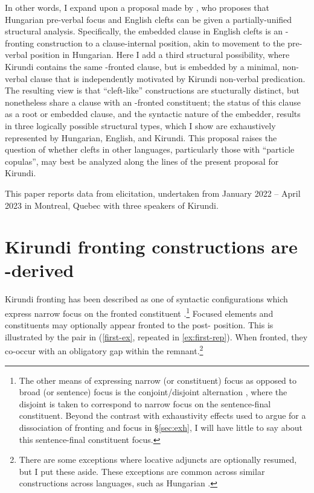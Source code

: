 \documentclass[12pt]{article}
\begin{document}
In other words, I expand upon a proposal made by \citet{ekiss-1998}, who proposes that Hungarian pre-verbal focus and English clefts can be given a partially-unified structural analysis. Specifically, the embedded clause in English clefts is an \abar{}-fronting construction to a clause-internal position, akin to movement to the pre-verbal position in Hungarian. Here I add a third structural possibility, where Kirundi contains the same \abar{}-fronted clause, but is embedded by a minimal, non-verbal clause that is independently motivated by Kirundi non-verbal predication. The resulting view is that ``cleft-like'' constructions are stucturally distinct, but nonetheless share a clause with an \abar{}-fronted constituent; the status of this clause as a root or embedded clause, and the syntactic nature of the embedder, results in three logically possible structural types, which I show are exhaustively represented by Hungarian, English, and Kirundi. This proposal raises the question of whether clefts in other languages, particularly those with ``particle copulas'', may best be analyzed along the lines of the present proposal for Kirundi.

This paper reports data from elicitation, undertaken from January 2022 – April 2023 in Montreal, Quebec with three speakers of Kirundi. %

\section{Kirundi fronting constructions are \abar{}-derived} \label{sec:cleft} 


Kirundi fronting has been described as one of syntactic configurations which express narrow focus on the fronted constituent \citep{edenmyr-2001,lafkioui-et-al-2016}.\footnote{The other means of expressing narrow (or constituent) focus as opposed to broad (or sentence) focus is the conjoint/disjoint alternation \citep{meeussen-1959,ndayiragije-1999,vanderwal-2017,nshemezimana-bostoen-2017}, where the disjoint is taken to correspond to narrow focus on the sentence-final constituent. Beyond the contrast with exhaustivity effects used to argue for a dissociation of fronting and focus in \S\ref{sec:exh}, I will have little to say about this sentence-final constituent focus.} Focused elements and constituents may optionally appear fronted to the post- position. This is illustrated by the pair in (\ref{first-ex}, repeated in \ref{ex:first-rep}). When fronted, they co-occur with an obligatory gap within the remnant.\footnote{There are some exceptions where locative adjuncts are optionally resumed, but I put these aside. These exceptions are common across similar constructions across languages, such as Hungarian \citep{ekiss-1987}.}
\end{document}
